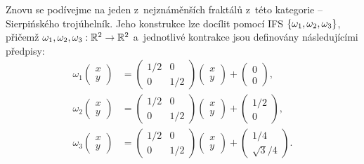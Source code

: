Znovu se podívejme na jeden z~nejznáměnších fraktálů z~této kategorie -- Sierpińského trojúhelník. Jeho konstrukce lze docílit pomocí IFS $\left\{\omega_1,\omega_2,\omega_3\right\}$, přičemž $\omega_1,\omega_2,\omega_3:\mathbb{R}^2 \rightarrow \mathbb{R}^2$ a~jednotlivé kontrakce jsou definovány následujícími předpisy:
\begin{align*}
    \omega_1\left(\begin{matrix}
        x\\
        y
    \end{matrix}\right)&=\left(\begin{matrix}
        1/2 & 0\\
        0 & 1/2
    \end{matrix}\right)\left(\begin{matrix}
        x\\
        y
    \end{matrix}\right)+\left(\begin{matrix}
        0\\
        0
    \end{matrix}\right),\\
    \omega_2\left(\begin{matrix}
        x\\
        y
    \end{matrix}\right)&=\left(\begin{matrix}
        1/2 & 0\\
        0 & 1/2
    \end{matrix}\right)\left(\begin{matrix}
        x\\
        y
    \end{matrix}\right)+\left(\begin{matrix}
        1/2\\
        0
    \end{matrix}\right),\\
    \omega_3\left(\begin{matrix}
        x\\
        y
    \end{matrix}\right)&=\left(\begin{matrix}
        1/2 & 0\\
        0 & 1/2
    \end{matrix}\right)\left(\begin{matrix}
        x\\
        y
    \end{matrix}\right)+\left(\begin{matrix}
        1/4\\
        \sqrt{3}/4
    \end{matrix}\right).
\end{align*}
